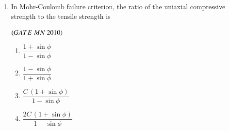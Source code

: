\documentclass{article}
\begin{document}
\begin{enumerate}[label=Q.\arabic*., itemsep=1em, leftmargin=0pt, itemindent=*, labelsep=0.5em]
\bigskip
\item In Mohr-Coulomb failure criterion, the ratio of the uniaxial compressive strength to the tensile
strength is
\\
\begin{flushright}
\hfill$\left(GATE\ MN\ 2010\right)$
\end{flushright}
\begin{multicols}{2}
\begin{enumerate}[label=(\Alph*), leftmargin=4em]
  \item $\dfrac{1 + \sin\phi}{1 - \sin\phi}$
  \item $\dfrac{1 - \sin\phi}{1 + \sin\phi}$
  \item $\dfrac{C\,(1 + \sin\phi)}{1 - \sin\phi}$
  \item $\dfrac{2C\,(1 + \sin\phi)}{1 - \sin\phi}$
\end{enumerate}
\end{multicols}


\end{enumerate}
\end{document}
